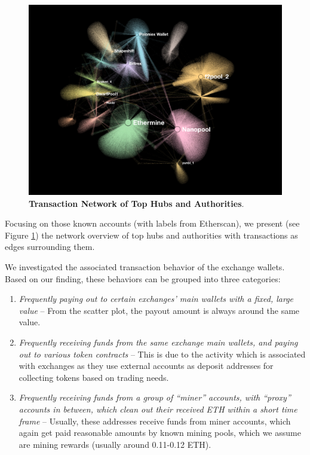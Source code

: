 \begin{figure}[t]
\centering
\includegraphics[width=1.0\textwidth]{images/7_implemenation_and_usecases/pagerank.jpeg}
\caption{\textbf{Transaction Network of Top Hubs and Authorities}.}
\label{fig:page-rank}
\end{figure}

Focusing on those known accounts (with labels from Etherscan), we present (see Figure \ref{fig:page-rank}) the network overview of top hubs and authorities with transactions as edges surrounding them.

We investigated the associated transaction behavior of the exchange wallets.
Based on our finding, these behaviors can be grouped into three categories:
\begin{enumerate}
    \item \textit{Frequently paying out to certain exchanges' main wallets with a fixed, large value} -- From the scatter plot, the payout amount is always around the same value.
    \item \textit{Frequently receiving funds from the same exchange main wallets, and paying out to various token contracts} -- This is due to the activity which is associated with exchanges as they use external accounts as deposit addresses for collecting tokens based on trading needs.

    \item \textit{Frequently receiving funds from a group of ``miner'' accounts, with ``proxy'' accounts in between, which clean out their received \gls{ETH} within a short time frame} -- Usually, these addresses receive funds from miner accounts, which again get paid reasonable amounts by known mining pools, which we assume are mining rewards (usually around 0.11-0.12 \gls{ETH}).
\end{enumerate}

